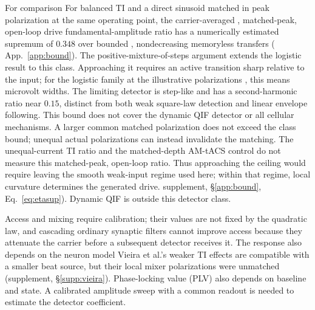 \documentclass[11pt,a4paper]{article}
\providecommand{\DIFaddtex}[1]{{\protect\color{blue} \sf #1}} %
\providecommand{\DIFdeltex}[1]{{\protect\color{red} \scriptsize #1}} %
\providecommand{\DIFaddbegin}{} %
\providecommand{\DIFaddend}{} %
\providecommand{\DIFdelbegin}{} %
\providecommand{\DIFdelend}{} %
\providecommand{\DIFadd}[1]{\texorpdfstring{\DIFaddtex{#1}}{#1}} %
\providecommand{\DIFdel}[1]{\texorpdfstring{\DIFdeltex{#1}}{}} %
\begin{document}
\DIFdelbegin \DIFdel{For comparison}\DIFdelend \DIFaddbegin \DIFadd{For balanced TI and a direct sinusoid matched in peak polarization at the
same operating point}\DIFaddend , the carrier-averaged \DIFdelbegin \DIFdel{, matched-peak, }\DIFdelend open-loop \DIFdelbegin \DIFdel{drive }\DIFdelend \DIFaddbegin \DIFadd{fundamental-amplitude
}\DIFaddend ratio has a numerically estimated supremum of $0.348$ over bounded\DIFaddbegin \DIFadd{,
}\DIFaddend nondecreasing memoryless transfers (\DIFdelbegin \DIFdel{App.~\ref{app:bound}). The positive-mixture-of-steps argument extends
the logistic result to this class. Approaching it requires an active transition
sharp relative to the input; for the logistic family at the illustrative
polarizations , this means microvolt widths. The limiting detector is step-like
and has a second-harmonic ratio near $0.15$, distinct from both weak
square-law detection and linear envelope following. This bound does not cover
the dynamic QIF detector or all cellular mechanisms. A larger common matched
polarization does not exceed the class bound; unequal actual polarizations can
instead invalidate the matching.
The unequal-current TI ratio and the matched-depth
AM-tACS control do not measure this matched-peak, open-loop ratio.
Thus approaching the ceiling would require leaving the smooth weak-input regime
used here; within that regime, local curvature determines the generated drive.
}\DIFdelend \DIFaddbegin \DIFadd{supplement, \S\ref{app:bound},
Eq.~\eqref{eq:etasup}). Dynamic QIF is outside this detector class.
}\DIFaddend

\DIFdelbegin \DIFdel{Access and mixing require calibration; their values are not fixed by the
quadratic law, and cascading ordinary synaptic filters cannot improve access
because they attenuate the carrier before a subsequent detector receives it. The response also depends on the neuron model}\DIFdelend \DIFaddbegin \DIFadd{Vieira et al.'s weaker TI effects \cite{vieira2024} are compatible with a
smaller beat source, but their local mixer polarizations were unmatched
(supplement, \S\ref{supp:vieira}). Phase-locking value (PLV) also depends on
baseline and state. A calibrated amplitude sweep with a common readout is
needed to estimate the detector coefficient.
}
\end{document}
